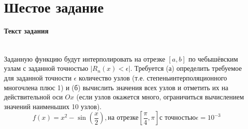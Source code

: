 \section{Шестое задание}

\paragraph{Текст задания} ~\\
Заданную функцию будут интерполировать на отрезке $\left[a, b\right]$ по чебышёвским узлам с заданной точностью $|R_{n}(x) < \epsilon|$. Требуется (а) определить требуемое для заданной точности $\epsilon$ количество узлов (т.е. степеньинтерполяционного многочлена плюс 1) и (б) вычислить значения всех узлов и отметить их на действительной оси $Ox$ (если узлов окажется много, ограничиться вычислением значений наименьших 10 узлов).\\[3mm]
\[
  f(x) = x^{2} - \sin\left(\frac{x}{2}\right), \text{на отрезке} \left[\frac{\pi}{4}, \pi\right] \text{с точностью} \epsilon = 10^{-3}
\]
